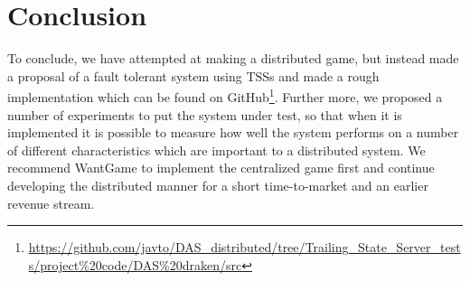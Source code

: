 \section{Conclusion}
\label{chap:con}
To conclude, we have attempted at making a distributed game, but instead made a proposal of a fault tolerant system using TSSs and made a rough implementation which can be found on GitHub\footnote{\url{https://github.com/javto/DAS\_distributed/tree/Trailing\_State\_Server\_tests/project\%20code/DAS\%20draken/src}}.
Further more, we proposed a number of experiments to put the system under test, so that when it is implemented it is possible to measure how well the system performs on a number of different characteristics which are important to a distributed system.
We recommend WantGame to implement the centralized game first and continue developing the distributed manner for a short time-to-market and an earlier revenue stream. 